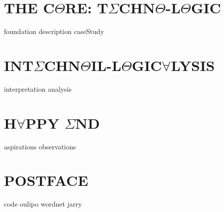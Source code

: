 \documentclass[oneside]{thesis}
\begin{document}
\part{\texorpdfstring{THE C$\Theta$RE: T$\Sigma$CHN$\Theta$-L$\Theta$GIC}{THE CORE: TECHNO-LOGIC}}
{foundation}
{description}
{caseStudy}

\part{\texorpdfstring{INT$\Sigma$CHN$\Theta$IL-L$\Theta$GIC$\forall$LYSIS}{INTECHNOIL-LOGICALYSIS}}
{interpretation}
{analysis}

\part{\texorpdfstring{H$\forall$PPY $\Sigma$ND}{HAPPILY EVER AFTER}}
{aspirations}
{observations}

\appendix

\part*{\texorpdfstring{POSTFACE}{POSTFACE}}
{code}
{oulipo}
{wordnet}
{jarry}
\clearpage

\pagestyle{plain}
{}
\clearpage

{}
\printnoidxglossary
\clearpage
\end{document}
